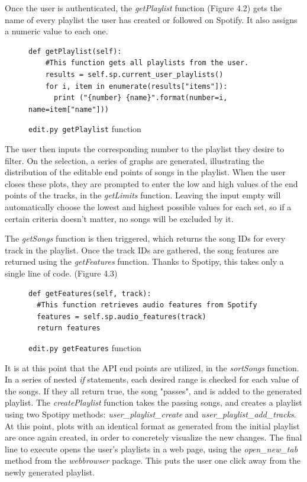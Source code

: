 Once the user is authenticated, the \textit{getPlaylist} function (Figure 4.2) gets the name
of every playlist the user has created or followed on Spotify. It also assigns
a numeric value to each one.


\begin{figure}
\begin{lstlisting}[aboveskip=5pt]
  def getPlaylist(self):
    #This function gets all playlists from the user.
    results = self.sp.current_user_playlists()
    for i, item in enumerate(results["items"]):
      print ("{number} {name}".format(number=i, name=item["name"]))
\end{lstlisting}
\caption{{\tt edit.py getPlaylist} function}
\end{figure}

The user then inputs the corresponding number to the playlist they desire to
filter. On the selection, a series of graphs are generated, illustrating the
distribution of the editable end points of songs in the playlist. When the user
closes these plots, they are prompted to enter the low and high values of the
end points of the tracks, in the \textit{getLimits} function. Leaving the input
empty will automatically choose the lowest and highest possible values for each
set, so if a certain criteria doesn't matter, no songs will be excluded by it.

The \textit{getSongs} function is then triggered, which
returns the song IDs for every track in the playlist. Once the track IDs are
gathered, the song features are returned using the \textit{getFeatures} function.
Thanks to Spotipy, this takes only a single line of code. (Figure 4.3)

\begin{figure}[!h]
\begin{lstlisting}
def getFeatures(self, track):
  #This function retrieves audio features from Spotify
  features = self.sp.audio_features(track)
  return features
\end{lstlisting}
\caption{{\tt edit.py getFeatures} function}
\end{figure}

It is at this point that the API end points are utilized, in the \textit{sortSongs}
function. In a series of nested \textit{if} statements, each desired range is
checked for each value of the songs. If they all return true, the song "passes",
and is added to the generated playlist. The \textit{createPlaylist} function
takes the passing songs, and creates a playlist using two Spotipy methods:
\textit{user\_playlist\_create} and \textit{user\_playlist\_add\_tracks}.
At this point, plots with an identical format as generated from the initial playlist
are once again created, in order to concretely visualize the new changes. The final
line to execute opens the user's playlists in a web page, using the \textit{open\_new\_tab}
method from the \textit{webbrowser} package. This puts the user one click away from
the newly generated playlist.

